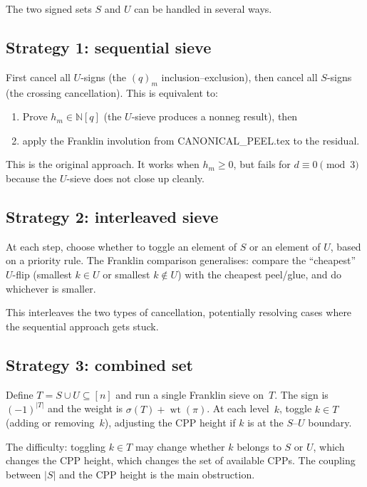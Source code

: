 \documentclass[11pt]{article}
\newcommand{\N}{\mathbb{N}}
\DeclareMathOperator{\wt}{wt}
\theoremstyle{plain}
\theoremstyle{definition}
\begin{document}
The two signed sets $S$ and $U$ can be handled in several
ways.

\subsection{Strategy 1: sequential sieve}

First cancel all $U$-signs (the $(q)_m$ inclusion--exclusion),
then cancel all $S$-signs (the crossing cancellation).
This is equivalent to:
\begin{enumerate}
  \item Prove $h_m \in \N[q]$ (the $U$-sieve produces
    a nonneg result), then
  \item apply the Franklin involution from
    CANONICAL\_PEEL.tex to the residual.
\end{enumerate}
This is the original approach.  It works when
$h_m \geq 0$, but fails for $d \equiv 0 \pmod{3}$ because
the $U$-sieve does not close up cleanly.

\subsection{Strategy 2: interleaved sieve}

At each step, choose whether to toggle an element of $S$
or an element of $U$, based on a priority rule.  The
Franklin comparison generalises: compare the ``cheapest''
$U$-flip (smallest $k \in U$ or smallest $k \notin U$) with
the cheapest peel/glue, and do whichever is smaller.

This interleaves the two types of cancellation, potentially
resolving cases where the sequential approach gets stuck.

\subsection{Strategy 3: combined set}

Define $T = S \cup U \subseteq [n]$ and run a single
Franklin sieve on~$T$.  The sign is $(-1)^{|T|}$ and the
weight is $\sigma(T) + \wt(\pi)$.  At each level~$k$,
toggle $k \in T$ (adding or removing~$k$), adjusting the
CPP height if $k$ is at the $S$--$U$ boundary.

The difficulty: toggling $k \in T$ may change whether $k$
belongs to $S$ or $U$, which changes the CPP height, which
changes the set of available CPPs.  The coupling between
$|S|$ and the CPP height is the main obstruction.


\end{document}
